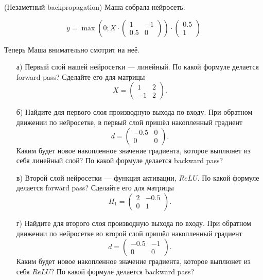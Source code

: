 \begin{problem}{(Незаметный backpropagation)}
    Маша собрала нейросеть: 
	
	\begin{equation*}
	y =   \max \left( 0;  X \cdot  \begin{pmatrix} 1 & -1 \\ 0.5 & 0 \end{pmatrix} \right) \cdot \begin{pmatrix} 0.5 \\ 1 \end{pmatrix} 
	\end{equation*}

	Теперь Маша внимательно смотрит на неё.
	
	\begin{enumerate}
		\item[а)]  Первый слой нашей нейросетки --- линейный. По какой формуле делается forward pass? Сделайте его для матрицы \[X =\begin{pmatrix} 1 & 2 \\ -1 & 2 \end{pmatrix}.\] 
		
		\item[б)] Найдите для первого слоя производную выхода по входу. При обратном движении по нейросетке, в первый слой пришёл накопленный градиент \[d = \begin{pmatrix} -0.5 & 0 \\ 0 & 0 \end{pmatrix}.\] Каким будет новое накопленное значение градиента, которое выплюнет из себя линейный слой? По какой формуле делается backward pass? 
		
		\item[в)] Второй слой нейросетки --- функция активации, $ReLU.$  По какой формуле делается forward pass? Сделайте его для матрицы \[H_1 = \begin{pmatrix} 2 & -0.5 \\ 0 & 1 \end{pmatrix}.\]
		
		\item[г)] Найдите для второго слоя производную выхода по входу. При обратном движении по нейросетке во второй слой пришёл накопленный градиент \[d = \begin{pmatrix} -0.5 & -1 \\ 0 & 0 \end{pmatrix}.\]  Каким будет новое накопленное значение градиента, которое выплюнет из себя $ReLU$?  По какой формуле делается backward pass? 
		

\end{enumerate}
\end{problem}
